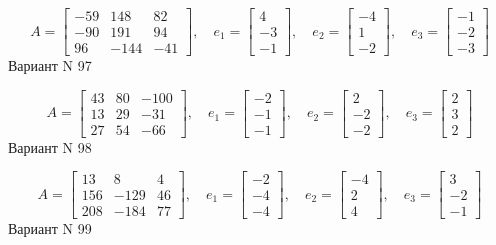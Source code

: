 \documentclass[11pt]{report}
\begin{document}
$$A = \left[\begin{matrix}-59 & 148 & 82\\-90 & 191 & 94\\96 & -144 & -41\end{matrix}\right],\quad e_1 = \left[\begin{matrix}4\\-3\\-1\end{matrix}\right],\quad e_2 = \left[\begin{matrix}-4\\1\\-2\end{matrix}\right],\quad e_3 = \left[\begin{matrix}-1\\-2\\-3\end{matrix}\right]$$Вариант N 97

$$A = \left[\begin{matrix}43 & 80 & -100\\13 & 29 & -31\\27 & 54 & -66\end{matrix}\right],\quad e_1 = \left[\begin{matrix}-2\\-1\\-1\end{matrix}\right],\quad e_2 = \left[\begin{matrix}2\\-2\\-2\end{matrix}\right],\quad e_3 = \left[\begin{matrix}2\\3\\2\end{matrix}\right]$$Вариант N 98

$$A = \left[\begin{matrix}13 & 8 & 4\\156 & -129 & 46\\208 & -184 & 77\end{matrix}\right],\quad e_1 = \left[\begin{matrix}-2\\-4\\-4\end{matrix}\right],\quad e_2 = \left[\begin{matrix}-4\\2\\4\end{matrix}\right],\quad e_3 = \left[\begin{matrix}3\\-2\\-1\end{matrix}\right]$$Вариант N 99
\end{document}
